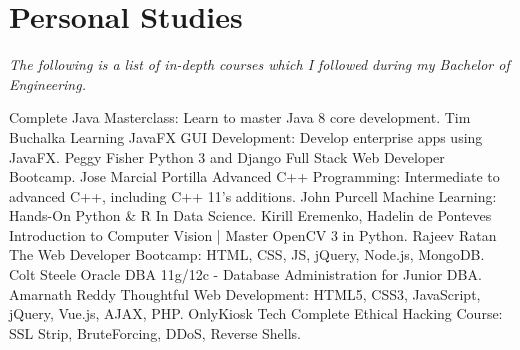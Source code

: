 \documentclass[]{friggeri-cv} %
\begin{document}
\patchcmd{\entry}{11.8cm}{14.8cm}{}{}
\section{Personal Studies}
\vspace{-3mm}
\emph{\small{The following is a list of in-depth courses which I followed during my Bachelor of Engineering.}}

\begin{entrylist}
\entry
{}
{Complete Java Masterclass: {\normalfont\small{Learn to master Java 8 core development.}}}
{Tim Buchalka}
{\vspace{-3mm}}
\entry
{}
{Learning JavaFX GUI Development: {\normalfont\small{Develop enterprise apps using JavaFX.}}}
{Peggy Fisher}
{\vspace{-3mm}}
\entry
{}
{Python 3 and Django Full Stack Web Developer Bootcamp{\normalfont\small{.}}}
{Jose Marcial Portilla}
{\vspace{-3mm}}
\entry
{}
{Advanced C++ Programming: {\normalfont\small{Intermediate to advanced C++, including C++ 11's additions.}}}
{John Purcell}
{\vspace{-3mm}}
\entry
{}
{Machine Learning: Hands-On Python \& R In Data Science{\normalfont\small{.}}}
{Kirill Eremenko, Hadelin de Ponteves}
{\vspace{-3mm}}
\entry
{}
{Introduction to Computer Vision | Master OpenCV 3 in Python{\normalfont\small{.}}}
{Rajeev Ratan}
{\vspace{-3mm}}
\entry
{}
{The Web Developer Bootcamp: {\normalfont\small{HTML, CSS, JS, jQuery, Node.js, MongoDB.}}}
{Colt Steele}
{\vspace{-3mm}}
\entry
{}
{Oracle DBA 11g/12c - Database Administration for Junior DBA{\normalfont\small{.}}}
{Amarnath Reddy}
{\vspace{-3mm}}
\entry
{}
{Thoughtful Web Development: {\normalfont\small{HTML5, CSS3, JavaScript, jQuery, Vue.js, AJAX, PHP.}}}
{OnlyKiosk Tech}
{\vspace{-3mm}}
\entry
{}
{Complete Ethical Hacking Course: {\normalfont\small{SSL Strip, BruteForcing, DDoS, Reverse Shells.}}}

\end{entrylist}
\end{document}
